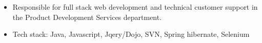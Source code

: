 \documentclass[10pt,a4paper]{altacv}
\begin{document}
\divider


\begin{itemize}
\item Responsible for full stack web development and technical customer support in the Product Development Services department.
\item Tech stack: Java, Javascript, Jqery/Dojo, SVN, Spring hibernate, Selenium
 \end{itemize}
\end{document}
